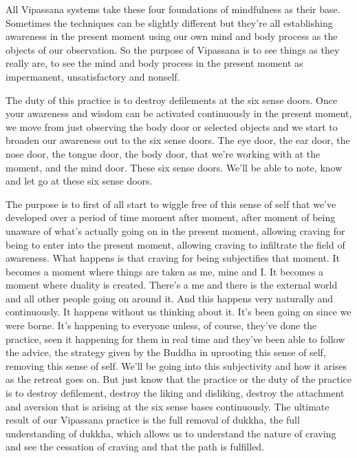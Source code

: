 \documentclass[letterpaper,10pt,english]{sphinxmanual}
\begin{document}
\sphinxAtStartPar
All Vipassana systems take these four foundations of mindfulness as
their base. Sometimes the techniques can be slightly different but they’re all
establishing awareness in the present moment using our own mind and body
  process as the objects of our observation. So the purpose of Vipassana is to
see things as they really are, to see the mind and body process in the present
moment as impermanent, unsatisfactory and non\sphinxhyphen{}self.

\sphinxAtStartPar
The duty of this practice is to destroy defilements at the six sense doors.
Once your awareness and wisdom can be activated continuously in the present moment, we move from just observing the body door or selected objects
and we start to broaden our awareness out to the six sense doors. The eye
door, the ear door, the nose door, the tongue door, the body door, that we’re
working with at the moment, and the mind door. These six sense doors. We’ll
be able to note, know and let go at these six sense doors.

\sphinxAtStartPar
The purpose is to first of all start to wiggle free of this sense of self that
we’ve developed over a period of time moment after moment, after moment
of being unaware of what’s actually going on in the present moment, allowing  craving  for  being  to  enter  into  the  present  moment,  allowing  craving
to infiltrate the field of awareness. What happens is that craving for being
subjectifies  that  moment.  It  becomes  a  moment  where  things  are  taken  as
me, mine and I. It becomes a moment where duality is created. There’s a me
and there is the external world and all other people going on around it. And
this happens very naturally and continuously. It happens without us thinking
about it. It’s been going on since we were borne. It’s happening to everyone
unless, of course, they’ve done the practice, seen it happening for them in
real time and they’ve been able to follow the advice, the strategy given by
the Buddha in uprooting this sense of self, removing this sense of self. We’ll
be going into this subjectivity and how it arises as the retreat goes on. But
just know that the practice or the duty of the practice is to destroy defilement, destroy the liking and disliking, destroy the attachment and aversion
that is arising at the six sense bases continuously. The ultimate result of our
Vipassana practice is the full removal of dukkha, the full understanding of
dukkha, which allows us to understand the nature of craving and see the cessation of craving and that the path is fulfilled.
\end{document}
